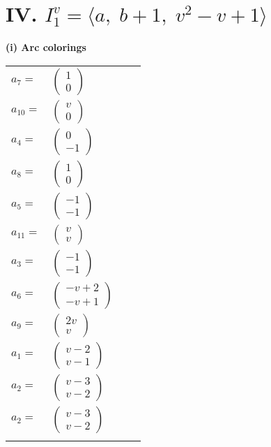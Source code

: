\documentclass[1p]{elsarticle_modified}
\theoremstyle{definition}
\begin{document}
\centering \section*{IV. $I^v_{1}= \langle a,\;b+1,\;v^2- v+1 \rangle$}
\flushleft \textbf{(i) Arc colorings}\\
\begin{tabular}{m{7pt} m{180pt} m{7pt} m{180pt} }
\flushright $a_{7}=$&$\begin{pmatrix}1\\0\end{pmatrix}$ \\
\flushright $a_{10}=$&$\begin{pmatrix}v\\0\end{pmatrix}$ \\
\flushright $a_{4}=$&$\begin{pmatrix}0\\-1\end{pmatrix}$ \\
\flushright $a_{8}=$&$\begin{pmatrix}1\\0\end{pmatrix}$ \\
\flushright $a_{5}=$&$\begin{pmatrix}-1\\-1\end{pmatrix}$ \\
\flushright $a_{11}=$&$\begin{pmatrix}v\\v\end{pmatrix}$ \\
\flushright $a_{3}=$&$\begin{pmatrix}-1\\-1\end{pmatrix}$ \\
\flushright $a_{6}=$&$\begin{pmatrix}- v+2\\- v+1\end{pmatrix}$ \\
\flushright $a_{9}=$&$\begin{pmatrix}2 v\\v\end{pmatrix}$ \\
\flushright $a_{1}=$&$\begin{pmatrix}v-2\\v-1\end{pmatrix}$ \\
\flushright $a_{2}=$&$\begin{pmatrix}v-3\\v-2\end{pmatrix}$\\ \flushright $a_{2}=$&$\begin{pmatrix}v-3\\v-2\end{pmatrix}$\\&\end{tabular}
\end{document}

